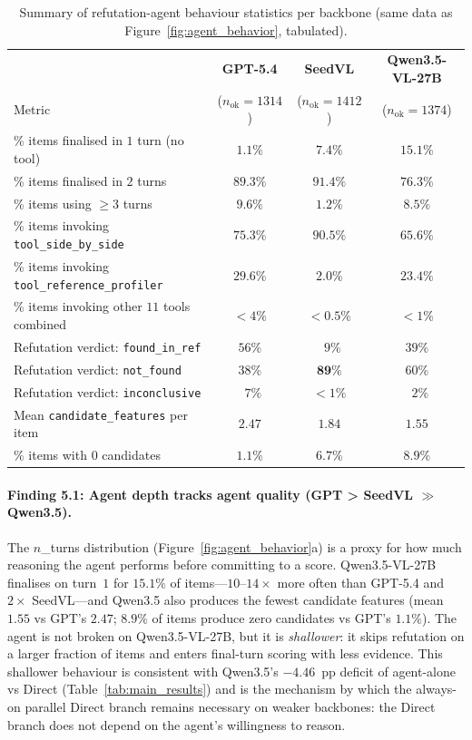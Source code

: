 \begin{table}[t]
\centering
\small
\setlength{\tabcolsep}{4pt}
\caption{Summary of refutation-agent behaviour statistics per backbone (same data as Figure~\ref{fig:agent_behavior}, tabulated).}
\label{tab:agent_behavior}
\begin{tabular}{lccc}
\toprule
& \textbf{GPT-5.4} & \textbf{SeedVL} & \textbf{Qwen3.5-VL-27B} \\
Metric & ($n_{\text{ok}}{=}1314$) & ($n_{\text{ok}}{=}1412$) & ($n_{\text{ok}}{=}1374$) \\
\midrule
\% items finalised in $1$ turn (no tool)      & $1.1\%$ & $7.4\%$ & $\mathbf{15.1\%}$ \\
\% items finalised in $2$ turns                & $89.3\%$ & $91.4\%$ & $76.3\%$ \\
\% items using $\ge 3$ turns                   & $9.6\%$ & $1.2\%$ & $8.5\%$ \\
\midrule
\% items invoking \texttt{tool\_side\_by\_side}        & $75.3\%$ & $\mathbf{90.5\%}$ & $65.6\%$ \\
\% items invoking \texttt{tool\_reference\_profiler}   & $\mathbf{29.6\%}$ & $2.0\%$  & $23.4\%$ \\
\% items invoking other $11$ tools combined            & $<4\%$   & $<0.5\%$ & $<1\%$ \\
\midrule
Refutation verdict: \texttt{found\_in\_ref}  & $56\%$  & $\phantom{0}9\%$  & $39\%$ \\
Refutation verdict: \texttt{not\_found}      & $38\%$  & $\mathbf{89\%}$   & $60\%$ \\
Refutation verdict: \texttt{inconclusive}    & $\phantom{0}7\%$   & $<1\%$ & $\phantom{0}2\%$ \\
\midrule
Mean \texttt{candidate\_features} per item   & $\mathbf{2.47}$ & $1.84$ & $1.55$ \\
\% items with $0$ candidates                 & $1.1\%$  & $6.7\%$  & $\mathbf{8.9\%}$ \\
\bottomrule
\end{tabular}
\end{table}

\paragraph{Finding 5.1: Agent depth tracks agent quality (GPT > SeedVL $\gg$ Qwen3.5).}
The $n$\_turns distribution (Figure~\ref{fig:agent_behavior}a) is a proxy for how much reasoning the agent performs before committing to a score. Qwen3.5-VL-27B finalises on turn~$1$ for $15.1\%$ of items---$10$--$14\times$ more often than GPT-5.4 and $2\times$ SeedVL---and Qwen3.5 also produces the fewest candidate features (mean $1.55$ vs GPT's $2.47$; $8.9\%$ of items produce zero candidates vs GPT's $1.1\%$). The agent is not broken on Qwen3.5-VL-27B, but it is \emph{shallower}: it skips refutation on a larger fraction of items and enters final-turn scoring with less evidence. This shallower behaviour is consistent with Qwen3.5's $-4.46$~pp deficit of agent-alone vs Direct (Table~\ref{tab:main_results}) and is the mechanism by which the always-on parallel Direct branch remains necessary on weaker backbones: the Direct branch does not depend on the agent's willingness to reason.

